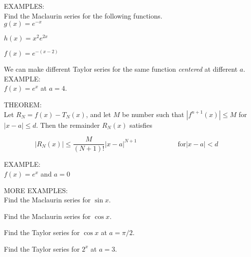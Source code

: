 \documentclass[11pt]{article}
\begin{document}
EXAMPLES:\\

Find the Maclaurin series for the following functions.\\

$g(x) = e^{-x}$

\vspace{1.5in}

$h(x) = x^2e^{2x}$

\vspace{1.5in}

$f(x) = e^{-(x-2)}$

\pagebreak
We can make different Taylor series for the same function \emph{centered} at different $a$.\\

EXAMPLE:\\

$f(x) = e^x$ at $a=4$.

 \vspace{4.5in}


 
 THEOREM: \\

 Let $R_N = f(x) - T_N(x)$, and let $M$ be number such that $|f^{n+1}(x)|\leq M$ for $|x-a|\leq d$.
 Then the remainder $R_N(x)$ satisfies

 \begin{displaymath}
|R_N(x)| \leq \frac{M}{(N+1)!}|x-a|^{N+1} \hspace{1in} \mbox{for} |x-a|<d
    \end{displaymath}

 \pagebreak

 EXAMPLE:\\
 
 $f(x) = e^x$ and $a=0$

\vspace{4in}

 MORE EXAMPLES:\\

 Find the Maclaurin series for $\sin{x}$.

 \pagebreak

  Find the Maclaurin series for $\cos{x}$.

  \vspace{4in}

  Find the Taylor series for $\cos{x}$ at $a=\pi/2$.

\pagebreak
  
  Find the Taylor series for $2^{x}$ at $a=3$.\\
\end{document}
